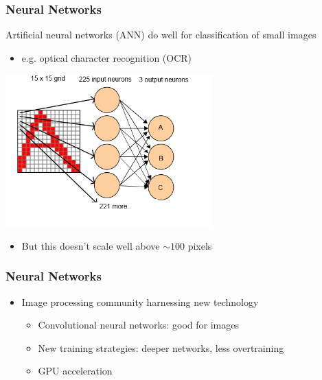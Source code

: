 \documentclass[10pt,professionalfonts,xcolor=table]{beamer}
\begin{document}
\begin{frame}
\frametitle{Neural Networks}
  \begin{itemize}
  \bang Artificial neural networks (ANN) do well for classification of small images
    \begin{itemize}
    \item e.g. optical character recognition (OCR)
    \end{itemize}
  \end{itemize}
\begin{center}
  \includegraphics[width=0.6\textwidth]{figures/figures/ocr_ann.png}
\end{center}
\begin{itemize}
    \item But this doesn't scale well above $\sim100$ pixels

\end{itemize}

\end{frame}

\begin{frame}
\frametitle{Neural Networks}

  \begin{itemize}
  \item Image processing community harnessing new technology
    \begin{itemize}
    \item Convolutional neural networks: good for images
    \item New training strategies: deeper networks, less overtraining
    \item GPU acceleration
    \end{itemize}
  \end{itemize}

\end{frame}
\end{document}
